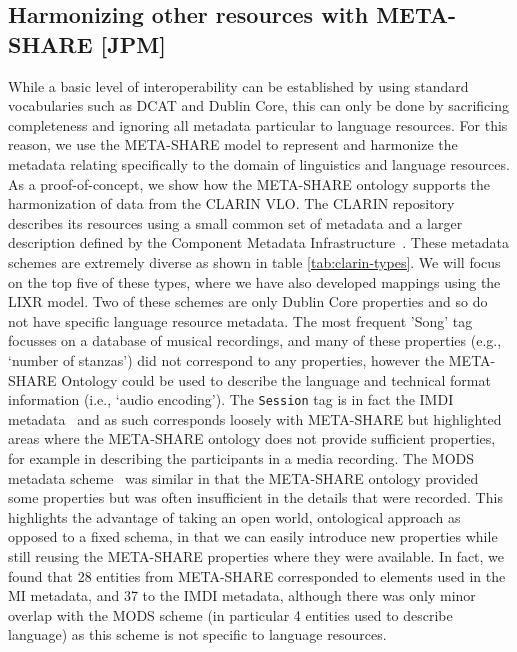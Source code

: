 \documentclass{llncs}
\begin{document}
{\subsection{Harmonizing other resources with META-SHARE [JPM]}
\label{sec:harmonization}
While a basic level of interoperability can be established by using standard
vocabularies such as DCAT and Dublin Core, this can only be done by sacrificing
completeness and ignoring all metadata particular to language resources. For
this reason, we use the META-SHARE model to represent and harmonize the metadata
relating specifically to the domain of linguistics and language resources. As a
proof-of-concept, we show how the META-SHARE ontology supports the harmonization
of data from the CLARIN VLO. The
CLARIN repository describes its resources using a small common set of metadata
and a larger description defined by the Component Metadata
Infrastructure~\cite[CMDI]{broeder2012cmdi}. These metadata schemes are
extremely diverse as shown in table \ref{tab:clarin-types}.
We will focus on the
top five of these types, where we have also developed mappings using the LIXR
model. Two of these schemes are only Dublin Core properties and so do not have
specific language resource metadata. The most frequent 'Song' tag focusses on
a database of musical recordings, and many of these properties (e.g., `number of
stanzas') did not correspond to any properties, however the META-SHARE Ontology
could be used to describe the language and technical format information (i.e., `audio
encoding'). The {\tt Session} tag is in fact the IMDI metadata~\cite{broeder2001imdi}
and as such corresponds loosely with META-SHARE but highlighted areas where the
META-SHARE ontology does not provide sufficient properties, for example in
describing the participants in a media recording. The MODS metadata
scheme~\cite{gartner2003mods} was
similar in that the META-SHARE ontology provided some properties but was often
insufficient in the details that were recorded. This highlights the advantage of
taking an open world, ontological approach as opposed to a fixed schema, in that
we can easily introduce new properties while still reusing the META-SHARE properties
where they were available. In fact, we found that 28 entities from META-SHARE
corresponded to elements used in the MI metadata, and 37 to the IMDI metadata,
although there was only minor overlap with the MODS scheme (in particular 4
entities used to describe language) as this scheme is not specific to language
resources.

}
\end{document}

